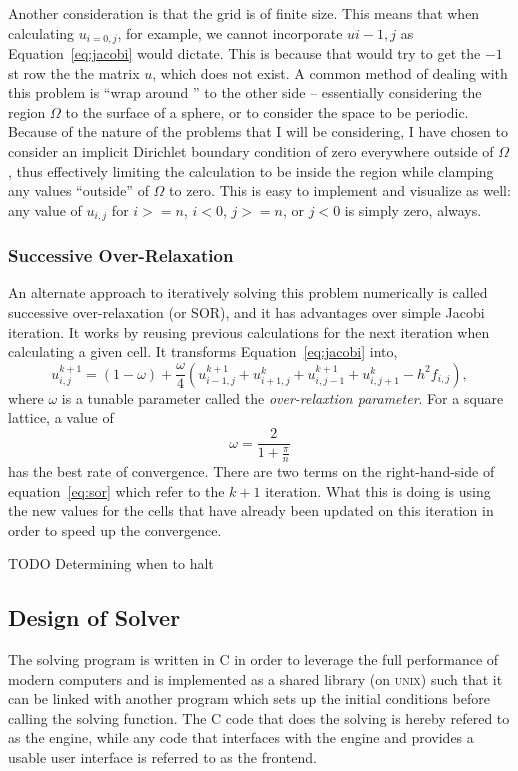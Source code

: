 Another consideration is that the grid is of finite size. This means that when calculating $u_{i=0,j}$, for example, we cannot
incorporate $u{i-1,j}$ as Equation~\ref{eq:jacobi} would dictate. This is because that would try to get the $-1$st row the
the matrix $u$, which does not exist. A common method of dealing with this problem is ``wrap around '' to the other side --
essentially considering the region $\Omega$ to the surface of a sphere, or to consider the space to be periodic. Because of
the nature of the problems that I will be considering, I have chosen to consider an implicit Dirichlet boundary condition
of zero everywhere outside of $\Omega$, thus effectively limiting the calculation to be inside the region while clamping any
values ``outside'' of $\Omega$ to zero. This is easy to implement and visualize as well: any value of $u_{i,j}$ for $i >= n$,
$i < 0$, $j >= n$, or $j < 0$ is simply zero, always.

\subsubsection{Successive Over-Relaxation}

An alternate approach to iteratively solving this problem numerically is called successive over-relaxation (or SOR), and
it has advantages over simple Jacobi iteration. It works by reusing previous calculations for the next iteration when
calculating a given cell. It transforms Equation~\ref{eq:jacobi} into,
\begin{equation} \label{eq:sor}
u_{i,j}^{k+1} = (1-\omega) + \frac{\omega}{4}\left(u_{i-1,j}^{k+1} + u_{i+1,j}^{k} + u_{i,j-1}^{k+1} + u_{i,j+1}^{k} - h^2 f_{i,j}\right),
\end{equation}
where $\omega$ is a tunable parameter called the \textit{over-relaxtion parameter}. For a square lattice, a value of
$$\omega = \frac{2}{1+\frac{\pi}{n}}$$
has the best rate of convergence. There are two terms on the right-hand-side of equation~\ref{eq:sor} which refer to the
$k+1$ iteration. What this is doing is using the new values for the cells that have already been updated on this iteration
in order to speed up the convergence.


TODO Determining when to halt


\subsection{Design of Solver}
The solving program is written in C in order to leverage the full performance of modern computers and is implemented
as a shared library (on \textsc{unix}) such that it can be linked with another program which sets up the initial conditions
before calling the solving function. The C code that does the solving is hereby refered to as the engine, while any code
that interfaces with the engine and provides a usable user interface is referred to as the frontend.

